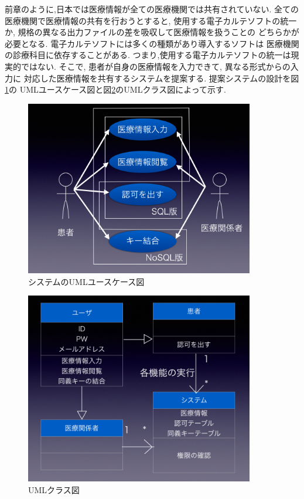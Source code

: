 前章のように,日本では医療情報が全ての医療機関では共有されていない.
全ての医療機関で医療情報の共有を行おうとすると,
使用する電子カルテソフトの統一か,
規格の異なる出力ファイルの差を吸収して医療情報を扱うことの
どちらかが必要となる.
電子カルテソフトには多くの種類があり導入するソフトは
医療機関の診療科目に依存することがある.
つまり,使用する電子カルテソフトの統一は現実的ではない.
そこで,
患者が自身の医療情報を入力できて,
異なる形式からの入力に
対応した医療情報を共有するシステムを提案する.
提案システムの設計を図\ref{system_construct}の
UMLユースケース図と図\ref{class}のUMLクラス図によって示す.

\begin{figure}[htbp]
  \begin{center}
    \includegraphics[width=10cm, bb=0 0 1003 768]{./gazou/system_construct2.png}
  \end{center}
  \caption{システムのUMLユースケース図}
  \label{system_construct}
\end{figure}

\begin{figure}[htbp]
  \begin{center}
    \includegraphics[width=10cm, bb=0 0 916 760]{./gazou/class.png}
  \end{center}
  \caption{UMLクラス図}
  \label{class}
\end{figure}

